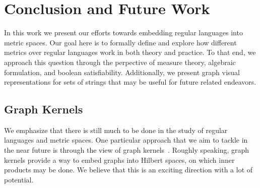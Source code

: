 
\section{Conclusion and Future Work}

In this work we present our efforts towards embedding regular languages
into metric spaces.
Our goal here is to formally define and explore how different metrics
over regular languages work in both theory and practice.
To that end, we approach this question through the perpective of
measure theory, algebraic formulation, and boolean satisfiability.
Additionally, we present graph visual representations for sets of strings
that may be useful for future related endeavors.


\subsection{Graph Kernels}
We emphasize that there is still much to be done in the study of
regular languages and metric spaces.
One particular approach that we aim to tackle in the near future
is through the view of graph kernels~\cite{vishwanathan2010graph}.
Roughly speaking, graph kernels provide a way to embed graphs
into Hilbert spaces, on which inner products may be done.
We believe that this is an exciting direction with a lot of potential.


